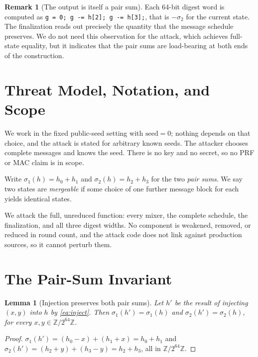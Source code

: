 \documentclass[10pt]{article}
\newtheorem{lemma}{Lemma}
\theoremstyle{definition}
\newtheorem{remark}{Remark}
\newcommand{\W}{\mathbb{Z}/2^{64}\mathbb{Z}}
\newcommand{\code}[1]{\texttt{#1}}
\begin{document}
\begin{remark}[The output is itself a pair sum]
\label{rem:output}
Each 64-bit digest word is computed as \code{g = 0; g -= h[2]; g -= h[3];}, that is $-\sigma_2$ for the current state. The finalization reads out precisely the quantity that the message schedule preserves. We do not need this observation for the attack, which achieves full-state equality, but it indicates that the pair sums are load-bearing at both ends of the construction.
\end{remark}

\section{Threat Model, Notation, and Scope}
\label{sec:scope}

We work in the fixed public-seed setting with $\mathrm{seed}=0$; nothing depends on that choice, and the attack is stated for arbitrary known seeds. The attacker chooses complete messages and knows the seed. There is no key and no secret, so no PRF or MAC claim is in scope.

Write $\sigma_1(h) = h_0 + h_1$ and $\sigma_2(h) = h_2 + h_3$ for the two \emph{pair sums}. We say two states are \emph{mergeable} if some choice of one further message block for each yields identical states.

We attack the full, unreduced function: every mixer, the complete schedule, the finalization, and all three digest widths. No component is weakened, removed, or reduced in round count, and the attack code does not link against production sources, so it cannot perturb them.

\section{The Pair-Sum Invariant}
\label{sec:invariant}

\begin{lemma}[Injection preserves both pair sums]
\label{lem:preserve}
Let $h'$ be the result of injecting $(x,y)$ into $h$ by \eqref{eq:inject}. Then $\sigma_1(h') = \sigma_1(h)$ and $\sigma_2(h') = \sigma_2(h)$, for every $x,y \in \W$.
\end{lemma}

\begin{proof}
$\sigma_1(h') = (h_0 - x) + (h_1 + x) = h_0 + h_1$ and $\sigma_2(h') = (h_2 + y) + (h_3 - y) = h_2 + h_3$, all in $\W$.
\end{proof}
\end{document}
